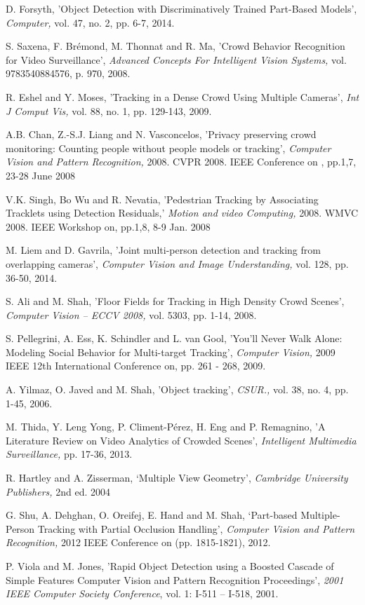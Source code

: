 \documentclass[12pt, onecolumn, conference]{IEEEtran}
\begin{document}
\begin{thebibliography}{1}
D. Forsyth, 'Object Detection with Discriminatively Trained Part-Based Models', \textit{Computer,} vol. 47, no. 2, pp. 6-7, 2014.

S. Saxena, F. Brémond, M. Thonnat and R. Ma, 'Crowd Behavior Recognition for Video Surveillance', \textit{Advanced Concepts For Intelligent Vision Systems,} vol. 9783540884576, p. 970, 2008.

R. Eshel and Y. Moses, 'Tracking in a Dense Crowd Using Multiple Cameras', \textit{Int J Comput Vis,} vol. 88, no. 1, pp. 129-143, 2009.

A.B. Chan, Z.-S.J. Liang and N. Vasconcelos, 'Privacy preserving crowd monitoring: Counting people without people models or tracking', \textit{Computer Vision and Pattern Recognition,} 2008. CVPR 2008. IEEE Conference on , pp.1,7, 23-28 June 2008

V.K. Singh, Bo Wu and R. Nevatia, 'Pedestrian Tracking by Associating Tracklets using Detection Residuals,' \textit{Motion and video Computing,} 2008. WMVC 2008. IEEE Workshop on, pp.1,8, 8-9 Jan. 2008

M. Liem and D. Gavrila, 'Joint multi-person detection and tracking from overlapping cameras', \textit{Computer Vision and Image Understanding,} vol. 128, pp. 36-50, 2014.

S. Ali and M. Shah, 'Floor Fields for Tracking in High Density Crowd Scenes', \textit{Computer Vision – ECCV 2008,} vol. 5303, pp. 1-14, 2008.

S. Pellegrini, A. Ess, K. Schindler and L. van Gool, 'You’ll Never Walk Alone: Modeling Social Behavior for Multi-target Tracking', \textit{Computer Vision,} 2009 IEEE 12th International Conference on, pp. 261 - 268, 2009.

A. Yilmaz, O. Javed and M. Shah, 'Object tracking', \textit{CSUR.,} vol. 38, no. 4, pp. 1-45, 2006.

M. Thida, Y. Leng Yong, P. Climent-Pérez, H. Eng and P. Remagnino, 'A Literature Review on Video Analytics of Crowded Scenes', \textit{Intelligent Multimedia Surveillance,} pp. 17-36, 2013.

R. Hartley and A. Zisserman, ‘Multiple View Geometry’, \textit{Cambridge University Publishers,} 2nd ed. 2004

G. Shu, A. Dehghan, O. Oreifej, E. Hand and M. Shah, ‘Part-based Multiple-Person Tracking with Partial Occlusion Handling’, \textit{Computer Vision and Pattern Recognition,} 2012 IEEE Conference on (pp. 1815-1821), 2012.

P. Viola and M. Jones, 'Rapid Object Detection using a Boosted Cascade of Simple Features Computer Vision and Pattern Recognition Proceedings', \textit{2001 IEEE Computer Society Conference}, vol. 1: I-511 – I-518, 2001.

\end{thebibliography}
 
\end{document}
